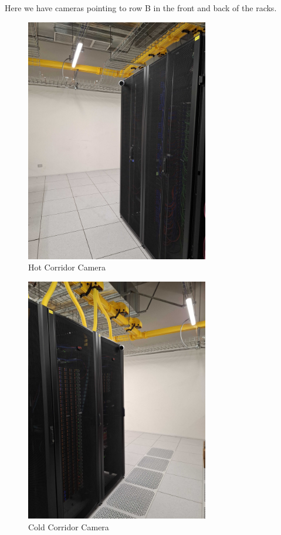 Here we have cameras pointing to row B in the front and back of the racks.

\begin{figure}
    \includegraphics[width=8cm]{7.jpg}
    \centering
    \caption*{Hot Corridor Camera}
  \end{figure}

  \newpage

  \begin{figure}
    \includegraphics[width=8cm]{9.jpg}
    \centering
    \caption*{Cold Corridor Camera}
  \end{figure}

